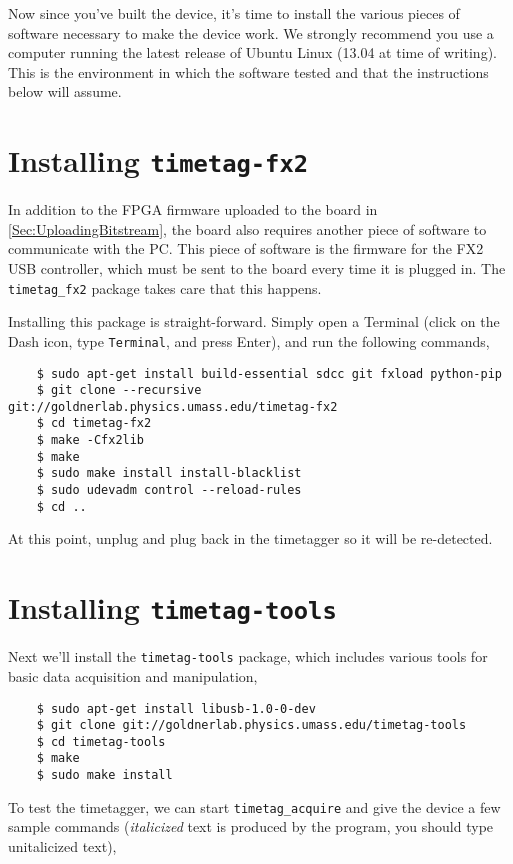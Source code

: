 Now since you've built the device, it's time to install the various
pieces of software necessary to make the device work. We strongly
recommend you use a computer running the latest release of Ubuntu
Linux (13.04 at time of writing). This is the environment in which the
software tested and that the instructions below will assume.

\section{Installing {\tt timetag-fx2}}
In addition to the FPGA firmware uploaded to the board in
\ref{Sec:UploadingBitstream}, the board also requires another piece of
software to communicate with the PC. This piece of software is the
firmware for the FX2 USB controller, which must be sent to the board
every time it is plugged in. The {\tt timetag\_fx2} package takes care
that this happens.

Installing this package is straight-forward. Simply open a Terminal
(click on the Dash icon, type {\tt Terminal}, and press Enter), and
run the following commands,

\begin{verbatim}
    $ sudo apt-get install build-essential sdcc git fxload python-pip
    $ git clone --recursive git://goldnerlab.physics.umass.edu/timetag-fx2
    $ cd timetag-fx2
    $ make -Cfx2lib
    $ make
    $ sudo make install install-blacklist
    $ sudo udevadm control --reload-rules
    $ cd ..
\end{verbatim}

At this point, unplug and plug back in the timetagger so it will be
re-detected.

\section{Installing {\tt timetag-tools}}

Next we'll install the {\tt timetag-tools} package, which includes
various tools for basic data acquisition and manipulation,

\begin{verbatim}
    $ sudo apt-get install libusb-1.0-0-dev
    $ git clone git://goldnerlab.physics.umass.edu/timetag-tools
    $ cd timetag-tools
    $ make
    $ sudo make install
\end{verbatim}

To test the timetagger, we can start {\tt timetag\_acquire} and give
the device a few sample commands ({\it italicized} text is produced by
the program, you should type unitalicized text),

